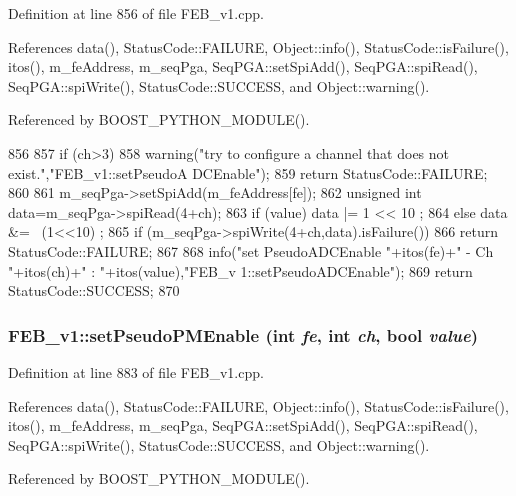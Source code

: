 Definition at line 856 of file FEB\_\-v1.cpp.

References data(), StatusCode::FAILURE, Object::info(), StatusCode::isFailure(), itos(), m\_\-feAddress, m\_\-seqPga, SeqPGA::setSpiAdd(), SeqPGA::spiRead(), SeqPGA::spiWrite(), StatusCode::SUCCESS, and Object::warning().

Referenced by BOOST\_\-PYTHON\_\-MODULE().


\begin{DoxyCode}
856                                                                  {
857   if (ch>3){
858     warning("try to configure a channel that does not exist.","FEB_v1::setPseudoA
      DCEnable");
859     return StatusCode::FAILURE;
860   }
861   m_seqPga->setSpiAdd(m_feAddress[fe]);
862   unsigned int data=m_seqPga->spiRead(4+ch);
863   if (value)  data |= 1 << 10 ;
864   else        data &= ~(1<<10) ;
865   if (m_seqPga->spiWrite(4+ch,data).isFailure()){
866     return StatusCode::FAILURE;
867   }
868   info("set PseudoADCEnable "+itos(fe)+" - Ch "+itos(ch)+" : "+itos(value),"FEB_v
      1::setPseudoADCEnable");
869   return StatusCode::SUCCESS;
870 }
\end{DoxyCode}
\hypertarget{classFEB__v1_af422c3cf889440d5d49cce51d98b496e}{
\subsubsection[{setPseudoPMEnable}]{ FEB\_\-v1::setPseudoPMEnable (int {\em fe}, \/  int {\em ch}, \/  bool {\em value})}}
\label{classFEB__v1_af422c3cf889440d5d49cce51d98b496e}


Definition at line 883 of file FEB\_\-v1.cpp.

References data(), StatusCode::FAILURE, Object::info(), StatusCode::isFailure(), itos(), m\_\-feAddress, m\_\-seqPga, SeqPGA::setSpiAdd(), SeqPGA::spiRead(), SeqPGA::spiWrite(), StatusCode::SUCCESS, and Object::warning().

Referenced by BOOST\_\-PYTHON\_\-MODULE().


